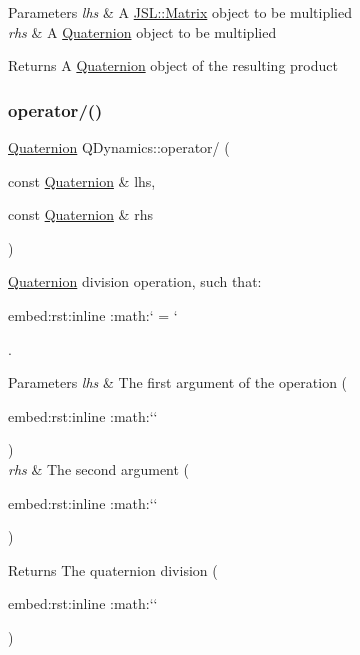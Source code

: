 \begin{DoxyParams}{Parameters}
{\em lhs} & A \hyperlink{classJSL_1_1Matrix}{J\+S\+L\+::\+Matrix} object to be multiplied \\
\hline
{\em rhs} & A \hyperlink{classQDynamics_1_1Quaternion}{Quaternion} object to be multiplied \\
\hline
\end{DoxyParams}
\begin{DoxyReturn}{Returns}
A \hyperlink{classQDynamics_1_1Quaternion}{Quaternion} object of the resulting product 
\end{DoxyReturn}
\mbox{\label{namespaceQDynamics_a48d51b6fed1449d7e9a62dac20a169af}} 
\subsubsection{\texorpdfstring{operator/()}{operator/()}}
{\footnotesize\ttfamily \hyperlink{classQDynamics_1_1Quaternion}{Quaternion} Q\+Dynamics\+::operator/ (\begin{DoxyParamCaption}\item[{const \hyperlink{classQDynamics_1_1Quaternion}{Quaternion} \&}]{lhs,  }\item[{const \hyperlink{classQDynamics_1_1Quaternion}{Quaternion} \&}]{rhs }\end{DoxyParamCaption})\hspace{0.3cm}{\ttfamily [inline]}}



\hyperlink{classQDynamics_1_1Quaternion}{Quaternion} division operation, such that\+: 

\begin{DoxyVerb}embed:rst:inline :math:` \oslash {}  =   \otimes {}` \end{DoxyVerb}
. 
\begin{DoxyParams}{Parameters}
{\em lhs} & The first argument of the operation (\begin{DoxyVerb}embed:rst:inline :math:`` \end{DoxyVerb}
) \\
\hline
{\em rhs} & The second argument (\begin{DoxyVerb}embed:rst:inline :math:`` \end{DoxyVerb}
) \\
\hline
\end{DoxyParams}
\begin{DoxyReturn}{Returns}
The quaternion division (\begin{DoxyVerb}embed:rst:inline :math:`\oslash{}` \end{DoxyVerb}
) 
\end{DoxyReturn}
\mbox{\label{namespaceQDynamics_a003e8d43977a4b818a6e90993d00201a}} 
